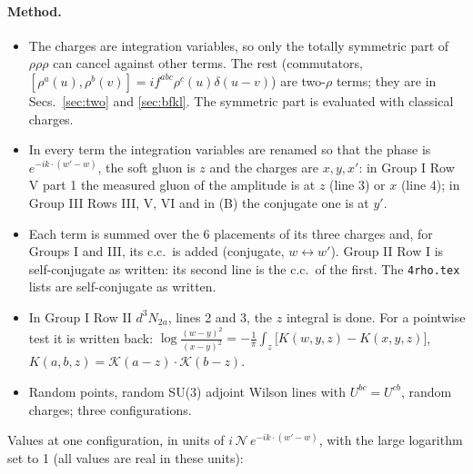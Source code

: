 \documentclass[10pt]{article}
\numberwithin{equation}{section}
\begin{document}
\paragraph{Method.}
\begin{itemize}
\item The charges are integration variables, so only the totally symmetric part of $\rho\rho\rho$ can cancel against other terms. The rest (commutators, $[\rho^a(u),\rho^b(v)]=if^{abc}\rho^c(u)\delta(u-v)$) are two-$\rho$ terms; they are in Secs.~\ref{sec:two} and \ref{sec:bfkl}. The symmetric part is evaluated with classical charges.
\item In every term the integration variables are renamed so that the phase is $e^{-ik\cdot(w'-w)}$, the soft gluon is $z$ and the charges are $x,y,x'$: in Group I Row V part 1 the measured gluon of the amplitude is at $z$ (line 3) or $x$ (line 4); in Group III Rows III, V, VI and in (B) the conjugate one is at $y'$.
\item Each term is summed over the 6 placements of its three charges and, for Groups I and III, its c.c.\ is added (conjugate, $w\leftrightarrow w'$). Group II Row I is self-conjugate as written: its second line is the c.c.\ of the first. The \texttt{4rho.tex} lists are self-conjugate as written.
\item In Group I Row II $d^3N_{2a}$, lines 2 and 3, the $z$ integral is done. For a pointwise test it is written back: $\log\frac{(w-y)^2}{(x-y)^2}=-\frac1\pi\int_z\big[K(w,y,z)-K(x,y,z)\big]$, $K(a,b,z)=\mathcal K(a-z)\cdot\mathcal K(b-z)$.
\item Random points, random SU(3) adjoint Wilson lines with $U^{bc}=U^{cb}$, random charges; three configurations.
\end{itemize}
Values at one configuration, in units of $i\,\mathcal N\,e^{-ik\cdot(w'-w)}$, with the large logarithm set to 1 (all values are real in these units):
\end{document}

